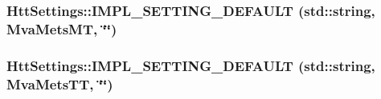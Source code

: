 \label{classHttSettings_a3d01e1ff66021ed02442fe9fc5427181}
\hypertarget{classHttSettings_a42c42494483c4ab580d8ad1b40094c25}{
\subsubsection[{IMPL\_\-SETTING\_\-DEFAULT}]{\setlength{\rightskip}{0pt plus 5cm}HttSettings::IMPL\_\-SETTING\_\-DEFAULT (std::string, \/  MvaMetsMT, \/  \char`\"{}\char`\"{})}}
\label{classHttSettings_a42c42494483c4ab580d8ad1b40094c25}
\hypertarget{classHttSettings_a384c503ac89815188770a2d62fd73e44}{
\subsubsection[{IMPL\_\-SETTING\_\-DEFAULT}]{\setlength{\rightskip}{0pt plus 5cm}HttSettings::IMPL\_\-SETTING\_\-DEFAULT (std::string, \/  MvaMetsTT, \/  \char`\"{}\char`\"{})}}
\label{classHttSettings_a384c503ac89815188770a2d62fd73e44}


